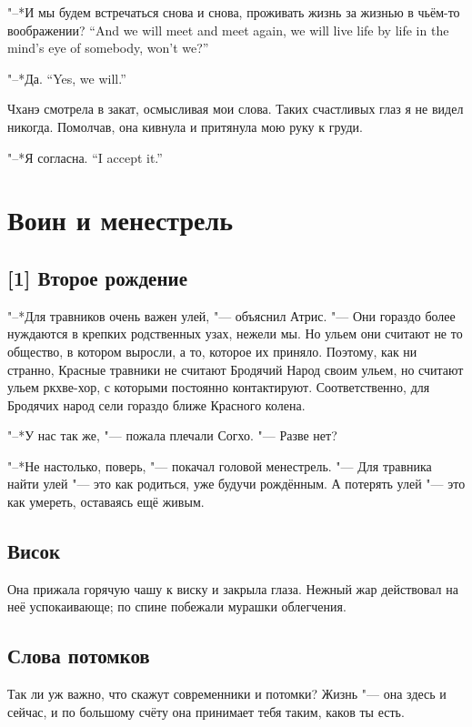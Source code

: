 {"--*И мы будем встречаться снова и снова, проживать жизнь за жизнью в чьём-то воображении?}
{``And we will meet and meet again, we will live life by life in the mind's eye of somebody, won't we?''}

{"--*Да.}
{``Yes, we will.''}

Чханэ смотрела в закат, осмысливая мои слова.
Таких счастливых глаз я не видел никогда.
Помолчав, она кивнула и притянула мою руку к груди.

{"--*Я согласна.}
{``I accept it.''}

\chapter{Воин и менестрель}

\section{[1] Второе рождение}

"--*Для травников очень важен улей, "--- объяснил Атрис.
"--- Они гораздо более нуждаются в крепких родственных узах, нежели мы.
Но ульем они считают не то общество, в котором выросли, а то, которое их приняло.
Поэтому, как ни странно, Красные травники не считают Бродячий Народ своим ульем, но считают ульем ркхве-хор, с которыми постоянно контактируют.
Соответственно, для Бродячих народ сели гораздо ближе Красного колена.

"--*У нас так же, "--- пожала плечали Согхо.
"--- Разве нет?

"--*Не настолько, поверь, "--- покачал головой менестрель.
"--- Для травника найти улей "--- это как родиться, уже будучи рождённым.
А потерять улей "--- это как умереть, оставаясь ещё живым.

\section{Висок}

Она прижала горячую чашу к виску и закрыла глаза.
Нежный жар действовал на неё успокаивающе;
по спине побежали мурашки облегчения.

\section{Слова потомков}

Так ли уж важно, что скажут современники и потомки?
Жизнь "--- она здесь и сейчас, и по большому счёту она принимает тебя таким, каков ты есть.

